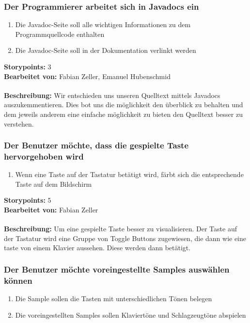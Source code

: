 \subsubsection{Der Programmierer arbeitet sich in Javadocs ein}

\begin{enumerate}
 \item Die Javadoc-Seite soll alle wichtigen Informationen zu dem Programmquellcode enthalten
 \item Die Javadoc-Seite soll in der Dokumentation verlinkt werden
\end{enumerate}

\textbf{Storypoints:} 3 \\
\textbf{Bearbeitet von:} Fabian Zeller, Emanuel Hubenschmid \\
\\
\textbf{Beschreibung:} Wir entschieden uns unseren Quelltext mittels Javadocs auszukemmentieren. 
Dies bot uns die möglichkeit den überblick zu behalten und dem jeweils anderem eine einfache 
möglichkeit zu bieten den Quelltext besser zu verstehen.


\subsubsection{Der Benutzer möchte, dass die gespielte Taste hervorgehoben wird}

\begin{enumerate}
 \item Wenn eine Taste auf der Tastatur betätigt wird, färbt sich die entsprechende Taste auf dem 
Bildschirm
\end{enumerate}

\textbf{Storypoints:} 5 \\
\textbf{Bearbeitet von:} Fabian Zeller \\
\\
\textbf{Beschreibung:} Um eine gespielte Taste besser zu visualisieren. Der Taste auf der Tastatur wird eine Gruppe von Toggle Buttons zugewiesen, die dann wie eine taste von einem Klavier aussehen. Diese werden dann betätigt.


\subsubsection{Der Benutzer möchte voreingestellte Samples auswählen können}

\begin{enumerate}
 \item Die Sample sollen die Tasten mit unterschiedlichen Tönen belegen
 \item Die voreingestellten Samples sollen Klaviertöne und Schlagzeugtöne 
abspielen
\end{enumerate}

